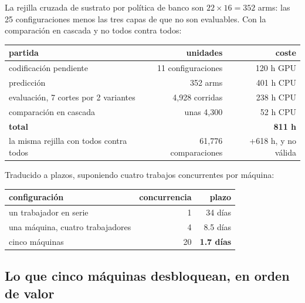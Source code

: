 La rejilla cruzada de sustrato por política de banco son $22 \times 16 = 352$ arms:
las 25 configuraciones menos las tres capas de  que no son evaluables.
Con la comparación en cascada y no todos contra todos:

\begin{center}
\begin{tabularx}{\linewidth}{@{}X r r@{}}
\toprule
partida & unidades & coste\\
\midrule
codificación pendiente                   & 11 configuraciones & 120 h GPU\\
predicción                               & 352 arms          & 401 h CPU\\
evaluación, 7 cortes por 2 variantes     & 4{,}928 corridas    & 238 h CPU\\
comparación en cascada                   & unas 4{,}300        & 52 h CPU\\
\midrule
\textbf{total}                           &                   & \textbf{811 h}\\
\midrule
la misma rejilla con todos contra todos  & 61{,}776 comparaciones & +618 h, y no válida\\
\bottomrule
\end{tabularx}
\end{center}

Traducido a plazos, suponiendo cuatro trabajos concurrentes por máquina:

\begin{center}
\begin{tabularx}{\linewidth}{@{}X r r@{}}
\toprule
configuración & concurrencia & plazo\\
\midrule
un trabajador en serie            &  1 & 34 días\\
una máquina, cuatro trabajadores  &  4 & 8.5 días\\
cinco máquinas                    & 20 & \textbf{1.7 días}\\
\bottomrule
\end{tabularx}
\end{center}

\subsection{Lo que cinco máquinas desbloquean, en orden de valor}

